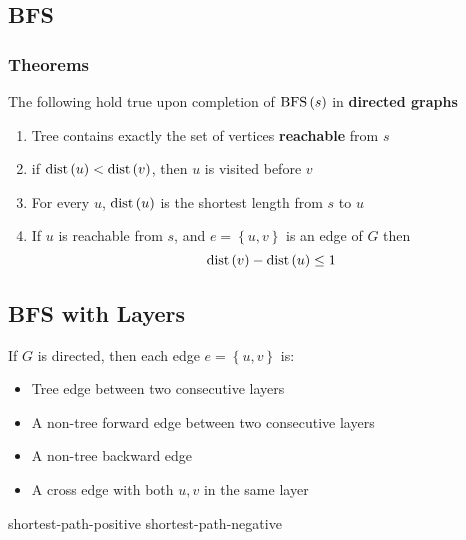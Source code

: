   \subsection{BFS}

    \subsubsection{Theorems}

      The following hold true upon completion of $ \operatorname{BFS}\left( s \right) $
      in \textbf{directed graphs}

      \begin{enumerate}
        \item Tree contains exactly the set of vertices \textbf{reachable}
        from $ s $
        \item if $ \operatorname{dist}\left( u \right) < \operatorname{dist}\left( v \right) $, then
        $ u $ is visited before $ v $
        \item For every $ u $, $ \operatorname{dist}\left( u \right) $ is the shortest length
        from $ s $ to $ u $
        \item If $ u $ is reachable from $ s $, and
        $ e = \left\{ u, v \right\} $ is an edge of $ G $ then
        \begin{equation}
          \operatorname{dist}\left( v \right) - \operatorname{dist}\left( u \right) \le 1
        \end{equation}
      \end{enumerate}

  \subsection{BFS with Layers}

    If $ G $ is directed, then each edge $ e = \left\{ u, v \right\} $
    is:

    \begin{itemize}
      \item Tree edge between two consecutive layers
      \item A non-tree forward edge between two consecutive layers
      \item A non-tree backward edge
      \item A cross edge with both $ u, v $ in the same layer
    \end{itemize}

{shortest-path-positive}
{shortest-path-negative}
